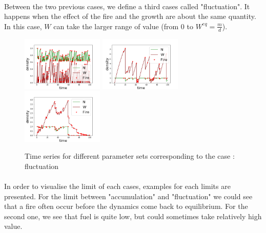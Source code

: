 \documentclass{article}
\begin{document}
\paragraph{}
Between the two previous cases, we define a third cases called "fluctuation". It happens when the effect of the fire and the growth are about the same quantity. In this case, $W$ can take the larger range of value (from $0$ to $W^{eq}=\frac{m}{d}$).
\begin{figure}[h!]
\centering
\includegraphics[width=3.9cm]{middle_1.png}
\includegraphics[width=3.9cm]{middle_2.png}
\includegraphics[width=3.9cm]{middle_3.png}
\caption{Time series for different parameter sets corresponding to the case : fluctuation}
\end{figure}


\paragraph{}
In order to visualise the limit of each cases, examples for each limits are presented.
For the limit between "accumulation" and "fluctuation" we could see that a fire often occur before the dynamics come back to equilibrium. For the second one, we see that fuel is quite low, but could sometimes take relatively high value.
\end{document}
